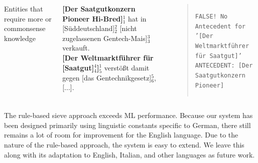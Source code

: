 \documentclass[25pt, a0paper, portrait, margin=10mm, innermargin=15mm,
blockverticalspace=15mm, colspace=15mm, subcolspace=8mm]{tikzposter}
\begin{document}
\begin{columns}
{


\innerblock
{Entities that require more or commonsense knowledge}
{\textbf{[Der Saatgutkonzern Pioneer Hi-Bred]}$^{1}_{1}$ hat in [Süddeutschland]$^{2}_{2}$ [nicht zugelassenen Gentech-Mais]$^{3}_{3}$ verkauft.\\\textbf{[Der Weltmarktführer für [Saatgut]$^{4}_{4}$]}$^{1}_{5}$ verstößt damit gegen [das Gentechnikgesetz]$^{5}_{6}$, [...].
\begin{quote}
\texttt{FALSE! No Antecedent for '[Der Weltmarktführer für Saatgut]'\\ANTECEDENT: [Der Saatgutkonzern Pioneer]}
\end{quote}}
} 


%




	
\end{columns}
	
	\begin{columns} 
	{
The rule-based sieve approach exceeds ML performance. Because our system has been designed primarily using linguistic constants specific to German, there still remains a lot of room for improvement for the English language. Due to the nature of the rule-based approach, the system is easy to extend. We leave this along with its adaptation to English, Italian, and other languages as future work.
	}
	


\end{columns}
\end{document}
